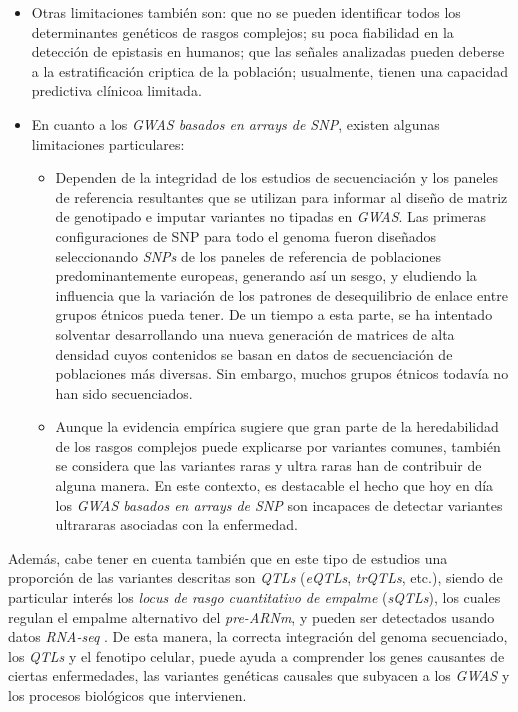 \documentclass[IB,BIB]{TFUOC}%
\begin{document}
\begin{itemize}
    \item Otras limitaciones también son: que no se pueden identificar todos los determinantes genéticos de rasgos complejos; su poca fiabilidad en la detección de epistasis en humanos; que las señales analizadas pueden deberse a la estratificación criptica de la población; usualmente, tienen una capacidad predictiva clínicoa limitada.
    \item En cuanto a los \textit{GWAS basados en arrays de SNP}, existen algunas limitaciones particulares:
    \begin{itemize}
        \item Dependen de la integridad de los estudios de secuenciación y los paneles de referencia resultantes que se utilizan para informar al diseño de matriz de genotipado e imputar variantes no tipadas en \textit{GWAS}. Las primeras configuraciones de SNP para todo el genoma fueron diseñados seleccionando \textit{SNPs} de los paneles de referencia de poblaciones predominantemente europeas, generando así un sesgo, y eludiendo la influencia que la variación de los patrones de desequilibrio de enlace entre grupos étnicos pueda tener. De un tiempo a esta parte, se ha intentado solventar desarrollando una nueva generación de matrices de alta densidad cuyos contenidos se basan en datos de secuenciación de poblaciones más diversas. Sin embargo, muchos grupos étnicos todavía no han sido secuenciados.
        \item Aunque la evidencia empírica sugiere que gran parte de la heredabilidad de los rasgos complejos puede explicarse por variantes comunes, también se considera que las variantes raras y ultra raras han de contribuir de alguna manera. En este contexto, es destacable el hecho que hoy en día los \textit{GWAS basados en arrays de SNP} son incapaces de detectar variantes ultrararas asociadas con la enfermedad.
    \end{itemize}
\end{itemize}

\normalsize


Además, cabe tener en cuenta también que en este tipo de estudios una proporción de las variantes descritas son \textit{QTLs} (\textit{eQTLs}, \textit{trQTLs}, etc.), siendo de particular interés los \textit{locus de rasgo cuantitativo de empalme} (\textit{sQTLs}), los cuales regulan el empalme alternativo del \textit{pre-ARNm}, y pueden ser detectados usando datos \textit{RNA-seq} \cite{noauthor_splicing_2021, monlong_identification_2014}. De esta manera, la correcta integración del genoma secuenciado, los \textit{QTLs} y el fenotipo celular, puede ayuda a comprender los genes causantes de ciertas enfermedades, las variantes genéticas causales que subyacen a los \textit{GWAS} y los procesos biológicos que intervienen.
\end{document}
